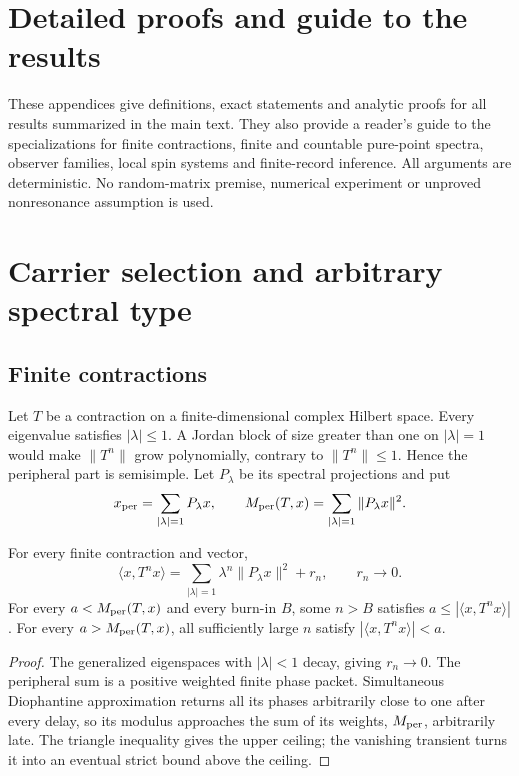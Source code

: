 \section{Detailed proofs and guide to the results}

These appendices give definitions, exact statements and analytic proofs for
all results summarized in the main text.  They also provide a reader's guide
to the specializations for finite contractions, finite and countable
pure-point spectra, observer families, local spin systems and finite-record
inference.  All arguments are deterministic.  No random-matrix premise,
numerical experiment or unproved nonresonance assumption is used.

\section{Carrier selection and arbitrary spectral type}

\subsection{Finite contractions}

Let $T$ be a contraction on a finite-dimensional complex Hilbert space.
Every eigenvalue satisfies $|\lambda|\le1$.  A Jordan block of size greater
than one on $|\lambda|=1$ would make $\|T^n\|$ grow polynomially, contrary
to $\|T^n\|\le1$.  Hence the peripheral part is semisimple.  Let
$P_\lambda$ be its spectral projections and put
\[
 x_{\rm per}=\sum_{|\lambda|=1}P_\lambda x,
 \qquad M_{\rm per}(T,x)=\sum_{|\lambda|=1}\|P_\lambda x\|^2.
\]

\begin{theorem}
For every finite contraction and vector,
\[
 \langle x,T^nx\rangle
 =\sum_{|\lambda|=1}\lambda^n\|P_\lambda x\|^2+r_n,
 \qquad r_n\to0.
\]
For every $a<M_{\rm per}(T,x)$ and every burn-in $B$, some $n>B$
satisfies $a\le|\langle x,T^nx\rangle|$.  For every
$a>M_{\rm per}(T,x)$, all sufficiently large $n$ satisfy
$|\langle x,T^nx\rangle|<a$.
\end{theorem}

\begin{proof}
The generalized eigenspaces with $|\lambda|<1$ decay, giving $r_n\to0$.
The peripheral sum is a positive weighted finite phase packet.  Simultaneous
Diophantine approximation returns all its phases arbitrarily close to one
after every delay, so its modulus approaches the sum of its weights,
$M_{\rm per}$, arbitrarily late.  The triangle inequality gives the upper
ceiling; the vanishing transient turns it into an eventual strict bound above
the ceiling.
\end{proof}

